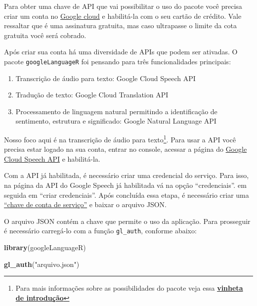 \documentclass[]{book}
\newenvironment{Shaded}{\begin{snugshade}}{\end{snugshade}}
\newcommand{\KeywordTok}[1]{\textcolor[rgb]{0.13,0.29,0.53}{\textbf{#1}}}
\newcommand{\NormalTok}[1]{#1}
\newcommand{\StringTok}[1]{\textcolor[rgb]{0.31,0.60,0.02}{#1}}
\providecommand{\tightlist}{%
  \setlength{\itemsep}{0pt}\setlength{\parskip}{0pt}}
\begin{document}
Para obter uma chave de API que vai possibilitar o uso do pacote você precisa criar
um conta no \href{https://cloud.google.com/}{Google cloud} e habilitá-la com o seu
cartão de crédito. Vale ressaltar que é uma assinatura gratuita, mas caso ultrapasse
o limite da cota gratuita você será cobrado.

Após criar sua conta há uma diversidade de APIs que podem ser ativadas. O pacote
\texttt{googleLanguageR} foi pensando para três funcionalidades principais:

\begin{enumerate}
\def\labelenumi{\arabic{enumi}.}
\tightlist
\item
  Transcrição de áudio para texto: Google Cloud Speech API
\item
  Tradução de texto: Google Cloud Translation API
\item
  Processamento de linguagem natural permitindo a identificação de sentimento,
  estrutura e significado: Google Natural Language API
\end{enumerate}

Nosso foco aqui é na transcrição de áudio para texto\footnote{Para mais informações sobre as
  possibilidades do pacote veja essa \href{https://cran.r-project.org/web/packages/googleLanguageR/vignettes/setup.html}{\textbf{vinheta de introdução}}}.
Para usar a API você precisa estar logado na sua conta, entrar no console, acessar
a página do \href{https://console.cloud.google.com/apis/api/speech.googleapis.com/overview}{Google Cloud Speech API} e
habilitá-la.

Com a API já habilitada, é necessário criar uma credencial do serviço. Para isso,
na página da API do Google Speech já habilitada vá na opção ``credenciais''. em seguida em
``criar credenciais''. Após concluída essa etapa, é necessário criar uma \href{https://cloud.google.com/iam/docs/creating-managing-service-account-keys}{``chave de conta de serviço''} e baixar o arquivo JSON.

O arquivo JSON contém a chave que permite o uso da aplicação. Para prosseguir é necessário carregá-lo com a função \texttt{gl\_auth}, conforme abaixo:

\begin{Shaded}
\begin{Highlighting}[]
\KeywordTok{library}\NormalTok{(googleLanguageR)}

\KeywordTok{gl_auth}\NormalTok{(}\StringTok{"arquivo.json"}\NormalTok{)}
\end{Highlighting}
\end{Shaded}
\end{document}
